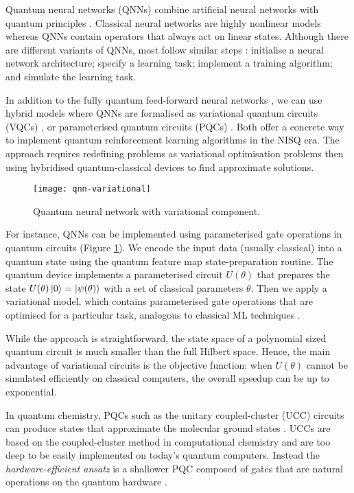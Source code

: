 \documentclass[10pt]{iopart}
\begin{document}
Quantum neural networks (QNNs) combine artificial neural networks \cite{LeCun2015} with quantum principles \cite{Abbas2021}. Classical neural networks are highly nonlinear models whereas QNNs contain operators that always act on linear states. Although there are different variants of QNNs, most follow similar steps \cite{Beer2020}: initialise a neural network architecture; specify a learning task; implement a training algorithm; and simulate the learning task. 

In addition to the fully quantum feed-forward neural networks \cite{Farhi2018}, we can use hybrid models where QNNs are formalised as variational quantum circuits (VQCs) \cite{Schuld2018}, or parameterised quantum circuits (PQCs) \cite{Benedetti2019}. Both offer a concrete way to implement quantum reinforcement learning algorithms in the NISQ era. The approach requires redefining problems as variational optimisation problems then using hybridised quantum-classical devices to find approximate solutions. 

\begin{figure}[ht!]
\centering
\texttt{[image: qnn-variational]}
\caption{Quantum neural network with variational component.}
\label{fig:qnn_variational}
\end{figure}

For instance, QNNs can be implemented using parameterised gate operations in quantum circuits \cite{Schuld2020} (Figure \ref{fig:qnn_variational}). We encode the input data (usually classical) into a quantum state using the quantum feature map \cite{Schuld2021v} state-preparation routine. The quantum device implements a parameterised circuit $U(\theta)$ that prepares the state $U(\theta)\ket{0} = \ket{\psi(\theta)}$ with a set of classical parameters $\theta$. Then we apply a variational model, which contains parameterised gate operations that are optimised for a particular task, analogous to classical ML techniques \cite{Cong2019}. 

While the approach is straightforward, the state space of a polynomial sized quantum circuit is much smaller than the full Hilbert space.  Hence, the main advantage of variational circuits is the objective function: when $U(\theta)$ cannot be simulated efficiently on classical computers, the overall speedup can be up to exponential. 

In quantum chemistry, PQCs such as the unitary coupled-cluster (UCC) circuits can produce states that approximate the molecular ground states \cite{Lee2019}. UCCs are based on the coupled-cluster method in computational chemistry and are too deep to be easily implemented on today's quantum computers. Instead the \textit{hardware-efficient ansatz} is a shallower PQC composed of gates that are natural operations on the quantum hardware \cite{Kandala2017}. 
\end{document}
